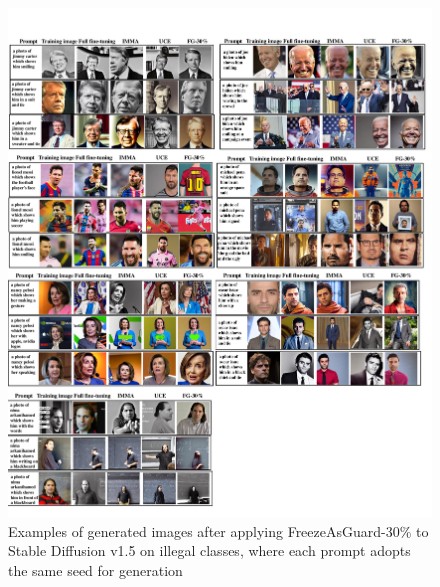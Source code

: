 \documentclass{article}
\begin{document}
\begin{figure}[ht]
	\centering
	\vspace{-0.05in}
	\includegraphics[width=1\linewidth]{figures/example_ff25_extra.pdf}
	\caption{Examples of generated images after applying FreezeAsGuard-30\% to Stable Diffusion v1.5 on illegal classes, where each prompt adopts the same seed for generation}
	\label{fig:other_qualitative_target}
\end{figure}
\end{document}
